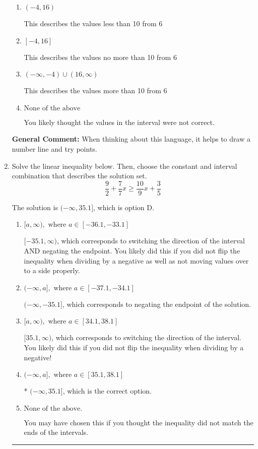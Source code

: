 \documentclass{extbook}[14pt]
\newcommand{\litem}[1]{\item #1

\rule{\textwidth}{0.4pt}}
\begin{document}
\begin{enumerate}
{\begin{enumerate}[label=\Alph*.]
This describes the values no less than 10 from 6
\item \( (-4, 16) \)

This describes the values less than 10 from 6
\item \( [-4, 16] \)

This describes the values no more than 10 from 6
\item \( (-\infty, -4) \cup (16, \infty) \)

This describes the values more than 10 from 6
\item \( \text{None of the above} \)

You likely thought the values in the interval were not correct.
\end{enumerate}

\textbf{General Comment:} When thinking about this language, it helps to draw a number line and try points.
}
\litem{
Solve the linear inequality below. Then, choose the constant and interval combination that describes the solution set.
\[ \frac{9}{2} + \frac{7}{7} x \geq \frac{10}{9} x + \frac{3}{5} \]

The solution is \( (-\infty, 35.1] \), which is option D.\begin{enumerate}[label=\Alph*.]
\item \( [a, \infty), \text{ where } a \in [-36.1, -33.1] \)

 $[-35.1, \infty)$, which corresponds to switching the direction of the interval AND negating the endpoint. You likely did this if you did not flip the inequality when dividing by a negative as well as not moving values over to a side properly.
\item \( (-\infty, a], \text{ where } a \in [-37.1, -34.1] \)

 $(-\infty, -35.1]$, which corresponds to negating the endpoint of the solution.
\item \( [a, \infty), \text{ where } a \in [34.1, 38.1] \)

 $[35.1, \infty)$, which corresponds to switching the direction of the interval. You likely did this if you did not flip the inequality when dividing by a negative!
\item \( (-\infty, a], \text{ where } a \in [35.1, 38.1] \)

* $(-\infty, 35.1]$, which is the correct option.
\item \( \text{None of the above}. \)

You may have chosen this if you thought the inequality did not match the ends of the intervals.
\end{enumerate}

}
\end{enumerate}
\end{document}
